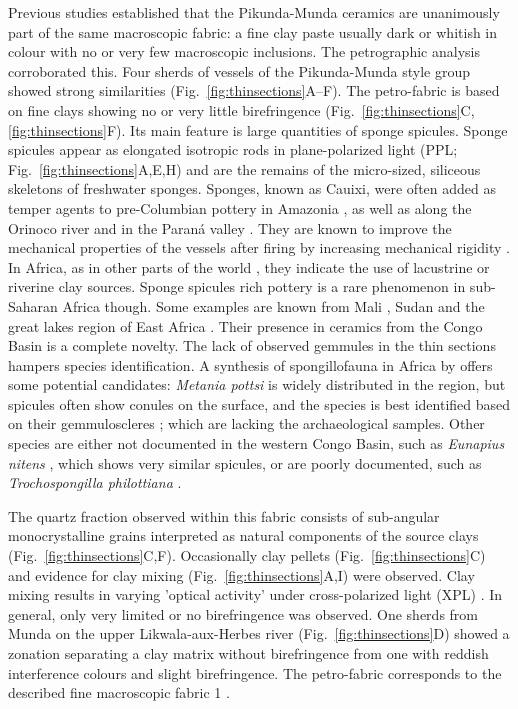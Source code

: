 \documentclass[smallextended,natbib]{svjour3}       %
\begin{document}
Previous studies \citet[60--69]{Seidensticker.2021e} established that the Pikunda-Munda ceramics are unanimously part of the same macroscopic fabric: a fine clay paste usually dark or whitish in colour with no or very few macroscopic inclusions. The petrographic analysis corroborated this. Four sherds of vessels of the Pikunda-Munda style group showed strong similarities (Fig.~\ref{fig:thinsections}A--F). The petro-fabric is based on fine clays showing no or very little birefringence (Fig.~\ref{fig:thinsections}C,\ref{fig:thinsections}F). Its main feature is large quantities of sponge spicules. Sponge spicules appear as elongated isotropic rods in plane-polarized light (PPL; Fig.~\ref{fig:thinsections}A,E,H) and are the remains of the micro-sized, siliceous skeletons of freshwater sponges. Sponges, known as Cauixi, were often added as temper agents to pre-Columbian pottery in Amazonia \citep{Linne.1932,Linne.1957,Costa.2004,Rodrigues.2017,Villagran.2022}, as well as along the Orinoco river \citep{LozadaMendieta.2019} and in the Paraná valley \citep{Ottalagano.2016}. They are known to improve the mechanical properties of the vessels after firing by increasing mechanical rigidity \citep{Natalio.2015}. In Africa, as in other parts of the world \citep{Cordell.1993,Bloch.2019}, they indicate the use of lacustrine or riverine clay sources. Sponge spicules rich pottery is a rare phenomenon in sub-Saharan Africa though. Some examples are known from Mali \citep{Brissaud.1986,Mcintosh.1989,Nixon.2017}, Sudan \citep{Adamson.1987} and the great lakes region of East Africa \citep[185]{Ashley.2005}. Their presence in ceramics from the Congo Basin is a complete novelty. The lack of observed gemmules in the thin sections hampers species identification. A synthesis of spongillofauna in Africa by \citet{Manconi.2009} offers some potential candidates: \textit{Metania pottsi} is widely distributed in the region, but spicules often show conules on the surface, and the species is best identified based on their gemmuloscleres \citep[38--47]{Manconi.2009}; which are lacking the archaeological samples. Other species are either not documented in the western Congo Basin, such as \textit{Eunapius nitens} \citep[149--151]{Manconi.2009}, which shows very similar spicules, or are poorly documented, such as \textit{Trochospongilla philottiana} \citep[198-199]{Manconi.2009}. 

The quartz fraction observed within this fabric consists of sub-angular monocrystalline grains interpreted as natural components of the source clays (Fig.~\ref{fig:thinsections}C,F). Occasionally clay pellets (Fig.~\ref{fig:thinsections}C) and evidence for clay mixing (Fig.~\ref{fig:thinsections}A,I) were observed. Clay mixing results in varying 'optical activity' under cross-polarized light (XPL) \citep{Whitbread.1986}. In general, only very limited or no birefringence was observed. One sherds from Munda on the upper Likwala-aux-Herbes river (Fig.~\ref{fig:thinsections}D) showed a zonation separating a clay matrix without birefringence from one with reddish interference colours and slight birefringence. The petro-fabric corresponds to the described fine macroscopic fabric 1 \citep[60--69]{Seidensticker.2021e}. 
 
\end{document}
